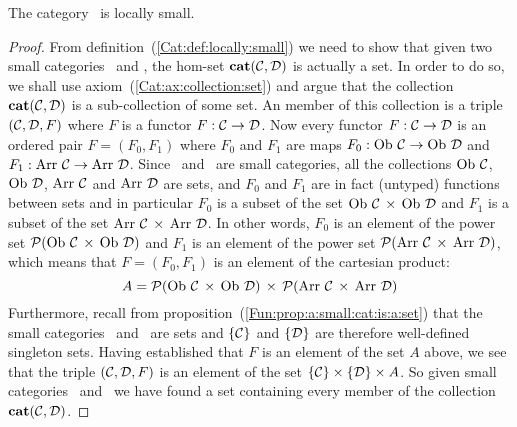 \begin{prop}\label{Fun:prop:cat:locally:small}
    The category \cat\ is locally small.
\end{prop}
\begin{proof}
    From definition~(\ref{Cat:def:locally:small}) we need to show that
    given two small categories \Cat\ and \Dat, the hom-set $\mbox{\bf cat}(\mbox{$\cal C$},\mbox{$\cal D$})$
    is actually a set. In order to do so, we shall use 
    axiom~(\ref{Cat:ax:collection:set}) and argue that the collection
    $\mbox{\bf cat}(\mbox{$\cal C$},\mbox{$\cal D$})$ is a sub-collection of some set. An member of
    this collection is a triple $(\mbox{$\cal C$},\mbox{$\cal D$},F)$ where $F$ is a functor
    $F:\mbox{$\cal C$}\to\mbox{$\cal D$}$. Now every functor $F:\mbox{$\cal C$}\to\mbox{$\cal D$}$ is an ordered pair
    $F=(F_{0},F_{1})$ where $F_{0}$ and $F_{1}$ are maps 
    $F_{0}:\mbox{\rm Ob}\ \mbox{$\cal C$}\to\mbox{\rm Ob}\ \mbox{$\cal D$}$ and $F_{1}:\mbox{\rm Arr}\ \mbox{$\cal C$}\to\mbox{\rm Arr}\ \mbox{$\cal D$}$.
    Since \Cat\ and \Dat\ are small categories, all the collections
    $\mbox{\rm Ob}\ \mbox{$\cal C$}$, $\ob\ \Dat$, $\mbox{\rm Arr}\ \mbox{$\cal C$}$ and $\mbox{\rm Arr}\ \mbox{$\cal D$}$ are sets,
    and $F_{0}$ and $F_{1}$ are in fact (untyped) functions between sets
    and in particular $F_{0}$ is a subset of the set $\ob\ \Cat\,\times\,\ob\ \Dat$
    and $F_{1}$ is a subset of the set $\arr\ \Cat\,\times\,\arr\ \Dat$.
    In other words, $F_{0}$ is an element of the power set 
    ${\cal P}(\ob\ \Cat\,\times\,\ob\ \Dat)$ and $F_{1}$ is an element of the
    power set ${\cal P}(\arr\ \Cat\,\times\,\arr\ \Dat)$, which means that
    $F=(F_{0},F_{1})$ is an element of the cartesian product:
        \[
            A={\cal P}(\ob\ \Cat\,\times\,\ob\ \Dat)\,\times\, 
              {\cal P}(\arr\ \Cat\,\times\,\arr\ \Dat)
        \]
    Furthermore, recall from 
    proposition~(\ref{Fun:prop:a:small:cat:is:a:set}) that the small 
    categories \Cat\ and \Dat\ are sets and $\{\mbox{$\cal C$}\}$ and $\{\mbox{$\cal D$}\}$ 
    are therefore well-defined singleton sets. Having established that
    $F$ is an element of the set $A$ above, we see that the triple
    $(\mbox{$\cal C$},\mbox{$\cal D$},F)$ is an element of the set $\{\mbox{$\cal C$}\}\times\{\mbox{$\cal D$}\}\times 
    A$. So given small categories \Cat\ and \Dat\, we have found a set
    containing every member of the collection $\mbox{\bf cat}(\mbox{$\cal C$},\mbox{$\cal D$})$.
\end{proof}
